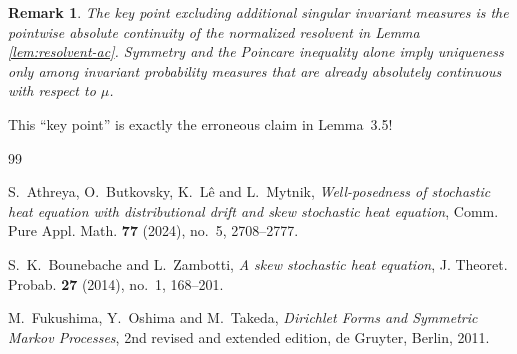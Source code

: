 \documentclass[12pt]{article}
\numberwithin{equation}{section}
\newtheorem{remark}[theorem]{Remark}
\newcommand{\1}{\mathbf 1}
\newcommand{\review}[1]{\begin{reviewbox}#1\end{reviewbox}}
\begin{document}
\begin{remark}
The key point excluding additional singular invariant measures is the pointwise
absolute continuity of the normalized resolvent in Lemma \ref{lem:resolvent-ac}.
Symmetry and the Poincare inequality alone imply uniqueness only among invariant
probability measures that are already absolutely continuous with respect to $\mu$.
\end{remark}
\review{This ``key point'' is exactly the erroneous claim in Lemma~3.5!}

\begin{thebibliography}{99}

S.~Athreya, O.~Butkovsky, K.~L\^e and L.~Mytnik,
\emph{Well-posedness of stochastic heat equation with distributional drift and skew stochastic heat equation},
Comm. Pure Appl. Math. \textbf{77} (2024), no.~5, 2708--2777.

S.~K.~Bounebache and L.~Zambotti,
\emph{A skew stochastic heat equation},
J. Theoret. Probab. \textbf{27} (2014), no.~1, 168--201.

M.~Fukushima, Y.~Oshima and M.~Takeda,
\emph{Dirichlet Forms and Symmetric Markov Processes},
2nd revised and extended edition, de Gruyter, Berlin, 2011.

\end{thebibliography}
\end{document}
